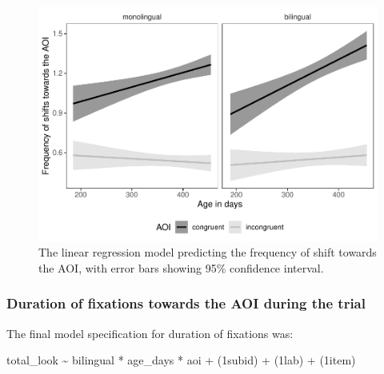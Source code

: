 \documentclass[
  english,
  ,man,floatsintext]{apa6}
\begin{document}
\begin{figure}
\centering
\includegraphics{gaze-following-paper_files/figure-latex/fig7-1.pdf}
\caption{\label{fig:fig7}The linear regression model predicting the frequency of shift towards the AOI, with error bars showing 95\% confidence interval.}
\end{figure}

\hypertarget{duration-of-fixations-towards-the-aoi-during-the-trial}{%
\subsubsection{Duration of fixations towards the AOI during the trial}\label{duration-of-fixations-towards-the-aoi-during-the-trial}}

The final model specification for duration of fixations was:

total\_look \textasciitilde{} bilingual * age\_days * aoi +
(1\textbar subid) +
(1\textbar lab) +
(1\textbar item)
\end{document}
